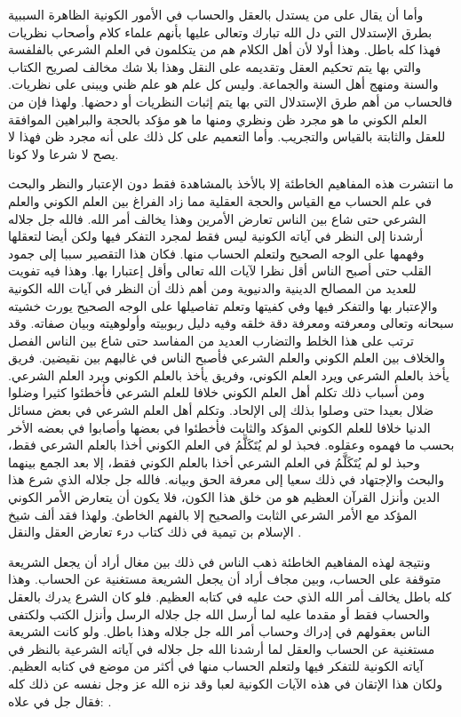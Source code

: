 وأما أن يقال على من يستدل بالعقل والحساب في الأمور الكونية الظاهرة السببية بطرق الإستدلال التي دل الله تبارك وتعالى عليها بأنهم علماء كلام وأصحاب نظريات فهذا كله باطل. وهذا أولا لأن أهل الكلام هم من يتكلمون في العلم الشرعي بالفلفسة والتي بها يتم تحكيم العقل وتقديمه على النقل وهذا بلا شك مخالف لصريح الكتاب والسنة ومنهج أهل السنة والجماعة. وليس كل علم هو علم ظني ويبنى على نظريات. فالحساب من أهم طرق الإستدلال التي بها يتم إثبات النظريات أو دحضها. ولهذا فإن من العلم الكوني ما هو مجرد ظن ونظري ومنها ما هو مؤكد بالحجة والبراهين الموافقة للعقل والثابتة بالقياس والتجريب. وأما التعميم على كل ذلك على أنه مجرد ظن فهذا لا يصح لا شرعا ولا كونا. 

ما انتشرت هذه المفاهيم الخاطئة إلا بالأخذ بالمشاهدة فقط دون الإعتبار والنظر والبحث في علم الحساب مع القياس والحجة العقلية مما زاد الفراغ بين العلم الكوني والعلم الشرعي حتى شاع بين الناس تعارض الأمرين وهذا يخالف أمر الله. فالله جل جلاله أرشدنا إلى النظر في آياته الكونية ليس فقط لمجرد التفكر فيها ولكن أيضا لتعقلها وفهمها على الوجه الصحيح ولتعلم الحساب منها. فكان هذا التقصير سببا إلى جمود القلب حتى أصبح الناس أقل نظرا لآيات الله تعالى وأقل إعتبارا بها. وهذا فيه تفويت للعديد من المصالح الدينية والدنيوية ومن أهم ذلك أن النظر في آيات الله الكونية والإعتبار بها والتفكر فيها وفي كفيتها وتعلم تفاصيلها على الوجه الصحيح يورث خشيته سبحانه وتعالى ومعرفته ومعرفة دقة خلقه وفيه دليل ربوبيته وأولوهيته وبيان صفاته. وقد ترتب على هذا الخلط والتضارب العديد من المفاسد حتى شاع بين الناس الفصل والخلاف بين العلم الكوني والعلم الشرعي فأصبح الناس في غالبهم بين نقيضين. فريق يأخذ بالعلم الشرعي ويرد العلم الكوني، وفريق يأخذ بالعلم الكوني ويرد العلم الشرعي. ومن أسباب ذلك تكلم أهل العلم الكوني خلافا للعلم الشرعي فأخطئوا كثيرا وضلوا ضلال بعيدا حتى وصلوا بذلك إلى الإلحاد. وتكلم أهل العلم الشرعي في بعض مسائل الدنيا خلافا للعلم الكوني المؤكد والثابت فأخطئوا في بعضها وأصابوا في بعضه الأخر بحسب ما فهموه وعقلوه. فحبذ لو لم يُتَكَلَّمُ في العلم الكوني أخذا بالعلم الشرعي فقط، وحبذ لو لم يُتَكَلَّمُ في العلم الشرعي أخذا بالعلم الكوني فقط، إلا بعد الجمع بينهما والبحث والإجتهاد في ذلك سعيا إلى معرفة الحق وبيانه. فالله جل جلاله الذي شرع هذا الدين وأنزل القرآن العظيم هو من خلق هذا الكون، فلا يكون أن يتعارض الأمر الكوني المؤكد مع الأمر الشرعي الثابت والصحيح إلا بالفهم الخاطئ. ولهذا فقد ألف شيخ الإسلام بن تيمية في ذلك كتاب درء تعارض العقل والنقل \cite{ibnTaimia_DTAWN}.


ونتيجة لهذه المفاهيم الخاطئة ذهب الناس في ذلك بين مغال أراد أن يجعل الشريعة متوقفة على الحساب، وبين مجاف أراد أن يجعل الشريعة مستغنية عن الحساب. وهذا كله باطل يخالف أمر الله الذي حث عليه في كتابه العظيم. فلو كان الشرع يدرك بالعقل والحساب فقط أو مقدما عليه لما أرسل الله جل جلاله الرسل وأنزل الكتب ولكتفى الناس بعقولهم في إدراك وحساب أمر الله جل جلاله وهذا باطل. ولو كانت الشريعة مستغنية عن الحساب والعقل لما أرشدنا الله جل جلاله في آياته الشرعية بالنظر في آياته الكونية للتفكر فيها ولتعلم الحساب منها في أكثر من موضع في كتابه العظيم. ولكان هذا الإتقان في هذه الآيات الكونية لعبا وقد نزه الله عز وجل نفسه عن ذلك كله فقال جل في علاه: \quranayah*[44][38-39] {\footnotesize (\surahname*[44])}.

